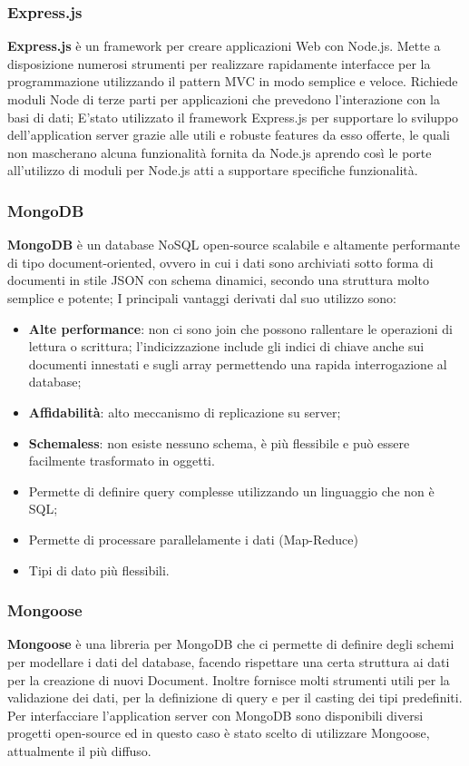 \subsubsection{Express.js}
\textbf{Express.js} è un framework per creare applicazioni Web con Node.js.
Mette a disposizione numerosi strumenti per realizzare rapidamente interfacce per la programmazione utilizzando il pattern MVC in modo semplice e veloce. Richiede moduli Node di terze parti per applicazioni che prevedono l’interazione con la basi di dati; \newline
E'stato utilizzato il framework Express.js per supportare lo sviluppo dell'application server grazie alle utili e robuste features da esso offerte, le quali non mascherano alcuna funzionalità fornita da Node.js aprendo così le porte all'utilizzo di moduli per Node.js atti a supportare specifiche
funzionalità.

\subsubsection{MongoDB}
\textbf{MongoDB} è un database NoSQL open-source scalabile e altamente performante di tipo document-oriented, ovvero in cui i dati sono archiviati sotto forma di documenti in stile JSON con schema dinamici, secondo una struttura molto semplice e potente;
I principali vantaggi derivati dal suo utilizzo sono:
\begin{itemize}
	\item \textbf{Alte performance}: non ci sono join che possono rallentare le operazioni di lettura o scrittura; l’indicizzazione include gli indici di chiave anche sui documenti innestati e sugli array permettendo una rapida interrogazione al database;
	\item \textbf{Affidabilità}: alto meccanismo di replicazione su server;
	\item \textbf{Schemaless}: non esiste nessuno schema, è più flessibile e può essere facilmente trasformato in oggetti.	
	\item Permette di definire query complesse utilizzando un linguaggio che non è SQL;
	\item Permette di processare parallelamente i dati (Map-Reduce)
	\item Tipi di dato più flessibili.
\end{itemize}

\subsubsection{Mongoose}
\textbf{Mongoose} è una libreria per MongoDB che ci permette di definire degli schemi per modellare i dati del database, facendo rispettare una certa struttura ai dati per la creazione di nuovi Document. Inoltre fornisce molti strumenti utili per la validazione dei dati, per la definizione di query e per il casting dei tipi predefiniti. \newline
Per interfacciare l'application server con MongoDB sono disponibili diversi progetti open-source ed in questo caso è stato scelto di utilizzare Mongoose, attualmente il più diffuso.	

